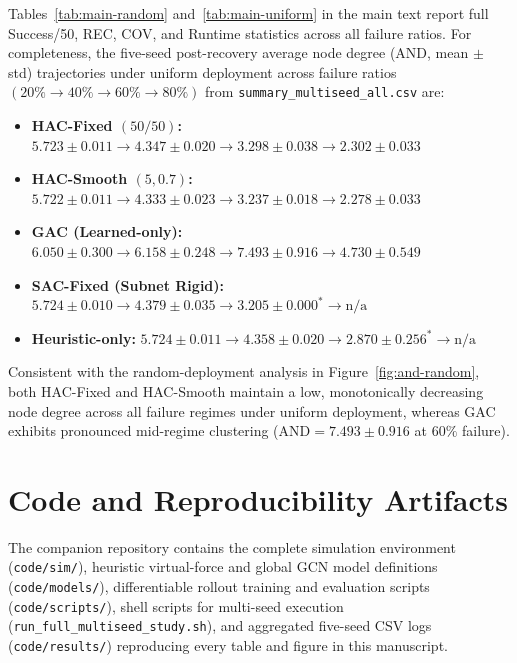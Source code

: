 \documentclass[11pt]{article}
\theoremstyle{plain}
\theoremstyle{definition}
\theoremstyle{remark}
\begin{document}
Tables~\ref{tab:main-random} and~\ref{tab:main-uniform} in the main text report full Success/50, REC, COV, and Runtime statistics across all failure ratios. For completeness, the five-seed post-recovery average node degree ($\mathrm{AND}$, mean $\pm$ std) trajectories under uniform deployment across failure ratios $(20\% \to 40\% \to 60\% \to 80\%)$ from \texttt{summary\_multiseed\_all.csv} are:
\begin{itemize}[nosep]
  \item \textbf{HAC-Fixed $(50/50)$:} $5.723\pm0.011 \to 4.347\pm0.020 \to 3.298\pm0.038 \to 2.302\pm0.033$
  \item \textbf{HAC-Smooth $(5, 0.7)$:} $5.722\pm0.011 \to 4.333\pm0.023 \to 3.237\pm0.018 \to 2.278\pm0.033$
  \item \textbf{GAC (Learned-only):} $6.050\pm0.300 \to 6.158\pm0.248 \to 7.493\pm0.916 \to 4.730\pm0.549$
  \item \textbf{SAC-Fixed (Subnet Rigid):} $5.724\pm0.010 \to 4.379\pm0.035 \to 3.205\pm0.000^* \to \text{n/a}$
  \item \textbf{Heuristic-only:} $5.724\pm0.011 \to 4.358\pm0.020 \to 2.870\pm0.256^* \to \text{n/a}$
\end{itemize}
Consistent with the random-deployment analysis in Figure~\ref{fig:and-random}, both HAC-Fixed and HAC-Smooth maintain a low, monotonically decreasing node degree across all failure regimes under uniform deployment, whereas GAC exhibits pronounced mid-regime clustering ($\mathrm{AND} = 7.493 \pm 0.916$ at $60\%$ failure).

\section{Code and Reproducibility Artifacts}
\label{app:code}

The companion repository contains the complete simulation environment (\texttt{code/sim/}), heuristic virtual-force and global GCN model definitions (\texttt{code/models/}), differentiable rollout training and evaluation scripts (\texttt{code/scripts/}), shell scripts for multi-seed execution (\nolinkurl{run_full_multiseed_study.sh}), and aggregated five-seed CSV logs (\texttt{code/results/}) reproducing every table and figure in this manuscript.
\end{document}
